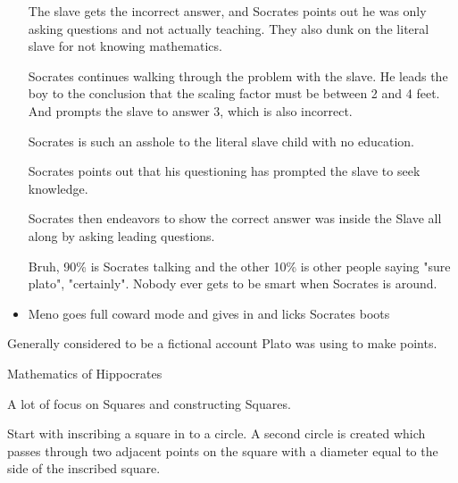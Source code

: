 \documentclass{report}
\begin{document}
\begin{description}
\begin{mdframed}
\begin{itemize}
\begin{mdframed}
                        The slave gets the incorrect answer,
                        and Socrates points out he was only
                        asking questions and not actually
                        teaching. They also dunk on the literal
                        slave for not knowing mathematics.

                        Socrates continues walking through the problem
                        with the slave. He leads the boy to the conclusion
                        that the scaling factor must be between 2 and 4
                        feet. And prompts the slave to answer 3, which
                        is also incorrect.

                        \begin{mdframed}
                            Socrates is such an asshole to the literal slave
                            child with no education.
                        \end{mdframed}

                        Socrates points out that his
                        questioning has prompted the slave
                        to seek knowledge. 

                        Socrates then endeavors to show the
                        correct answer was inside the Slave
                        all along by asking leading questions.

                        \begin{mdframed}
                            Bruh, 90\% is Socrates talking and the
                            other 10\% is other people saying
                            "sure plato", "certainly". Nobody
                            ever gets to be smart when Socrates
                            is around.
                        \end{mdframed}
                    \end{mdframed}
                \item Meno goes full coward mode and gives in
                    and licks Socrates boots
            \end{itemize}
            Generally considered to be a fictional account
            Plato was using to make points.
        \end{mdframed}
        \pagebreak
    \item Mathematics of Hippocrates
        \begin{mdframed}
            A lot of focus on Squares and constructing
            Squares.
        \end{mdframed}
        \begin{mdframed}
            Start with inscribing a square in to a 
            circle. A second circle is created which
            passes through two adjacent points on the square
            with a diameter equal to the side of the inscribed
            square.


\end{mdframed}
\end{description}
\end{document}
